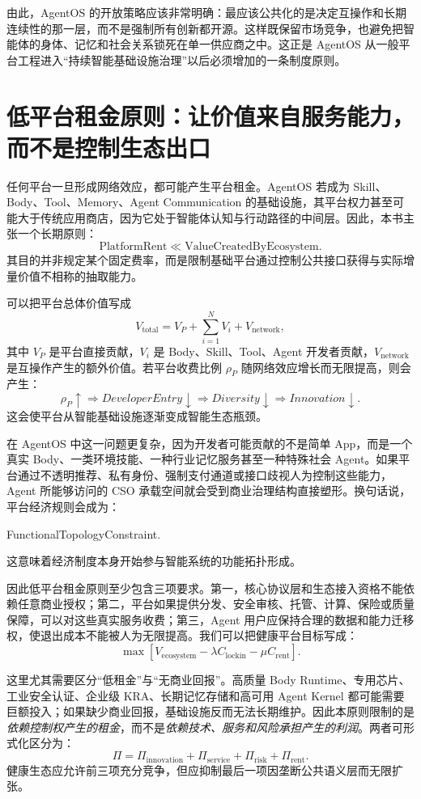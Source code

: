 由此，AgentOS 的开放策略应该非常明确：最应该公共化的是决定互操作和长期连续性的那一层，而不是强制所有创新都开源。这样既保留市场竞争，也避免把智能体的身体、记忆和社会关系锁死在单一供应商之中。这正是 AgentOS 从一般平台工程进入``持续智能基础设施治理''以后必须增加的一条制度原则。

\section{低平台租金原则：让价值来自服务能力，而不是控制生态出口}

任何平台一旦形成网络效应，都可能产生平台租金。AgentOS 若成为 Skill、Body、Tool、Memory、Agent Communication 的基础设施，其平台权力甚至可能大于传统应用商店，因为它处于智能体认知与行动路径的中间层。因此，本书主张一个长期原则：
\[
\boxed{
\text{PlatformRent}
\ll
\text{ValueCreatedByEcosystem}.
}
\]
其目的并非规定某个固定费率，而是限制基础平台通过控制公共接口获得与实际增量价值不相称的抽取能力。

可以把平台总体价值写成
\[
V_{\mathrm{total}}
=
V_P
+
\sum_{i=1}^{N}V_i
+
V_{\mathrm{network}},
\]
其中 $V_P$ 是平台直接贡献，$V_i$ 是 Body、Skill、Tool、Agent 开发者贡献，$V_{\mathrm{network}}$ 是互操作产生的额外价值。若平台收费比例 $\rho_P$ 随网络效应增长而无限提高，则会产生：
\[
\rho_P\uparrow
\Rightarrow
DeveloperEntry\downarrow
\Rightarrow
Diversity\downarrow
\Rightarrow
Innovation\downarrow.
\]
这会使平台从智能基础设施逐渐变成智能生态瓶颈。

在 AgentOS 中这一问题更复杂，因为开发者可能贡献的不是简单 App，而是一个真实 Body、一类环境技能、一种行业记忆服务甚至一种特殊社会 Agent。如果平台通过不透明推荐、私有身份、强制支付通道或接口歧视人为控制这些能力，Agent 所能够访问的 CSO 承载空间就会受到商业治理结构直接塑形。换句话说，平台经济规则会成为：
\begin{statementbox}
FunctionalTopologyConstraint.
\end{statementbox}
这意味着经济制度本身开始参与智能系统的功能拓扑形成。

因此低平台租金原则至少包含三项要求。第一，核心协议层和生态接入资格不能依赖任意商业授权；第二，平台如果提供分发、安全审核、托管、计算、保险或质量保障，可以对这些真实服务收费；第三，Agent 用户应保持合理的数据和能力迁移权，使退出成本不能被人为无限提高。我们可以把健康平台目标写成：
\[
\max
\left[
V_{\mathrm{ecosystem}}
-
\lambda C_{\mathrm{lockin}}
-
\mu C_{\mathrm{rent}}
\right].
\]

这里尤其需要区分``低租金''与``无商业回报''。高质量 Body Runtime、专用芯片、工业安全认证、企业级 KRA、长期记忆存储和高可用 Agent Kernel 都可能需要巨额投入；如果缺少商业回报，基础设施反而无法长期维护。因此本原则限制的是\emph{依赖控制权产生的租金}，而不是\emph{依赖技术、服务和风险承担产生的利润}。两者可形式化区分为：
\[
\Pi
=
\Pi_{\mathrm{innovation}}
+
\Pi_{\mathrm{service}}
+
\Pi_{\mathrm{risk}}
+
\Pi_{\mathrm{rent}}.
\]
健康生态应允许前三项充分竞争，但应抑制最后一项因垄断公共语义层而无限扩张。

